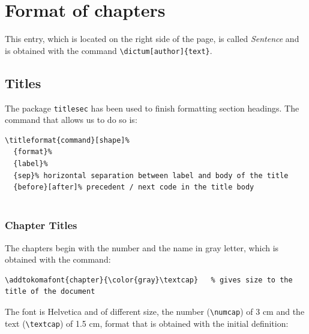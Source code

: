\documentclass[a4paper,
                             twoside,
                             BCOR1.0cm,
                             DIV11,
                             parskip=full,
                             11pt]{scrbook}
\begin{document}
\title{}
\author{
    \\http://phobos.xtec.cat/jqueralt
}
\date{\today}

\maketitle
\tableofcontents

\chapter{Format of chapters}\label{cap:primer}

This entry, which is located on the right side of the page, is called \textit {Sentence} and is obtained with the command
 \verb+\dictum[author]{text}+.
\section{Titles}\label{sec:titles}
The package \verb+titlesec+ has been used to finish formatting section headings. The command that allows us to do so is:
\begin{scriptsize}
\begin{verbatim}
\titleformat{command}[shape]%
  {format}%
  {label}%
  {sep}% horizontal separation between label and body of the title
  {before}[after]% precedent / next code in the title body
 

\end{verbatim}
\end{scriptsize}

\subsection{Chapter Titles}\label{sbsec:captit}
The chapters begin with the number and the name in gray letter, which is obtained with the command:
\begin{scriptsize}
\begin{verbatim}
\addtokomafont{chapter}{\color{gray}\textcap}   % gives size to the title of the document
\end{verbatim}
\end{scriptsize}
The font is Helvetica and of different size, the number (\verb+\numcap+) of 3 cm and the text (\verb+\textcap+) of 1.5 cm, format that is obtained with the initial definition:
\end{document}
